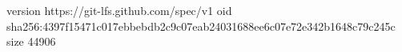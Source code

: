 version https://git-lfs.github.com/spec/v1
oid sha256:4397f15471c017ebbebdb2c9c07eab24031688ee6c07e72e342b1648c79c245c
size 44906
